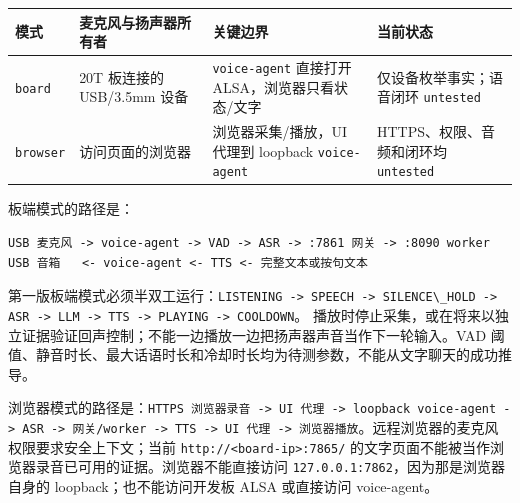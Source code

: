\begin{longtable}[]{@{}
  >{\raggedright\arraybackslash}p{}
  >{\raggedright\arraybackslash}p{}
  >{\raggedright\arraybackslash}p{}
  >{\raggedright\arraybackslash}p{}@{}}
\toprule\noalign{}
\begin{minipage}[b]{\linewidth}\raggedright
模式
\end{minipage} & \begin{minipage}[b]{\linewidth}\raggedright
麦克风与扬声器所有者
\end{minipage} & \begin{minipage}[b]{\linewidth}\raggedright
关键边界
\end{minipage} & \begin{minipage}[b]{\linewidth}\raggedright
当前状态
\end{minipage} \\
\midrule\noalign{}
\endhead
\bottomrule\noalign{}
\endlastfoot
\passthrough{\lstinline!board!} & 20T 板连接的 USB/3.5mm 设备 &
\passthrough{\lstinline!voice-agent!} 直接打开 ALSA，浏览器只看状态/文字
& 仅设备枚举事实；语音闭环 \passthrough{\lstinline!untested!} \\
\passthrough{\lstinline!browser!} & 访问页面的浏览器 &
浏览器采集/播放，UI 代理到 loopback
\passthrough{\lstinline!voice-agent!} & HTTPS、权限、音频和闭环均
\passthrough{\lstinline!untested!} \\
\end{longtable}

板端模式的路径是：

\begin{lstlisting}
USB 麦克风 -> voice-agent -> VAD -> ASR -> :7861 网关 -> :8090 worker
USB 音箱   <- voice-agent <- TTS <- 完整文本或按句文本
\end{lstlisting}

第一版板端模式必须半双工运行：\passthrough{\lstinline!LISTENING -> SPEECH -> SILENCE\_HOLD -> ASR -> LLM -> TTS -> PLAYING -> COOLDOWN!}。
播放时停止采集，或在将来以独立证据验证回声控制；不能一边播放一边把扬声器声音当作下一轮输入。VAD
阈值、静音时长、最大话语时长和冷却时长均为待测参数，不能从文字聊天的成功推导。

浏览器模式的路径是：\passthrough{\lstinline!HTTPS 浏览器录音 -> UI 代理 -> loopback voice-agent -> ASR -> 网关/worker -> TTS -> UI 代理 -> 浏览器播放!}。远程浏览器的麦克风权限要求安全上下文；当前
\passthrough{\lstinline!http://<board-ip>:7865/!}
的文字页面不能被当作浏览器录音已可用的证据。浏览器不能直接访问
\passthrough{\lstinline!127.0.0.1:7862!}，因为那是浏览器自身的
loopback；也不能访问开发板 ALSA 或直接访问 voice-agent。

